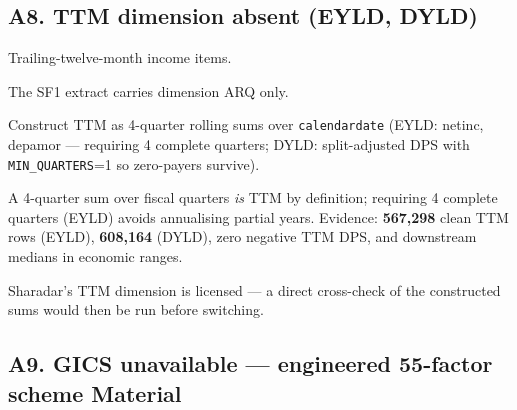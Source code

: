 \documentclass[11pt,a4paper]{article}
\newcommand{\WARN}[1]{\textcolor{warn}{\textbf{#1}}}
\begin{document}
\subsection{A8. TTM dimension absent (EYLD, DYLD)}

\begin{description}[style=nextline]
  \item[USE4] Trailing-twelve-month income items.
  \item[Deviation] The SF1 extract carries dimension ARQ only.
  \item[Solution] Construct TTM as 4-quarter rolling sums over
    \texttt{calendardate} (EYLD: netinc, depamor --- requiring 4 complete
    quarters; DYLD: split-adjusted DPS with \texttt{MIN\_QUARTERS}=1 so
    zero-payers survive).
  \item[Validity] A 4-quarter sum over fiscal quarters \emph{is} TTM by
    definition; requiring 4 complete quarters (EYLD) avoids annualising
    partial years. Evidence: \textbf{567{,}298} clean TTM rows (EYLD),
    \textbf{608{,}164} (DYLD), zero negative TTM DPS, and downstream medians in
    economic ranges.
  \item[Revisit when] Sharadar's TTM dimension is licensed --- a direct
    cross-check of the constructed sums would then be run before switching.
\end{description}


\subsection{A9. GICS unavailable --- engineered 55-factor scheme \hfill \WARN{Material}}
\end{document}
